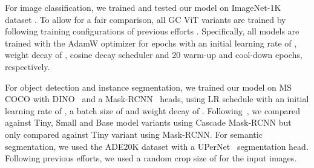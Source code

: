 \documentclass{article}
\theoremstyle{plain}
\theoremstyle{definition}
\theoremstyle{remark}
\begin{document}
For image classification, we trained and tested our model on ImageNet-1K dataset \citep{deng2009imagenet}. To allow for a fair comparison, all GC ViT variants are trained by following training configurations of previous efforts \citep{liu2021swin,yang2021focal,chu2021twins}. Specifically, all models are trained with the AdamW \citep{kingma2014adam} optimizer for  epochs with an initial learning rate of , weight decay of , cosine decay scheduler and 20 warm-up and cool-down epochs, respectively.


For object detection and instance segmentation, we trained our model on MS COCO \citep{lin2014microsoft} with DINO~\citep{he2017mask} and a Mask-RCNN~\citep{he2017mask} heads, using  LR schedule with an initial learning rate of , a batch size of  and weight decay of . Following~\cite{liu2022convnet}, we compared against Tiny, Small and Base model variants using Cascade Mask-RCNN but only compared against Tiny variant using Mask-RCNN. For semantic segmentation, we used the ADE20K dataset \citep{zhou2017scene} with a UPerNet~\citep{xiao2018unified} segmentation head. Following previous efforts, we used a random crop size of  for the input images. 
\end{document}
